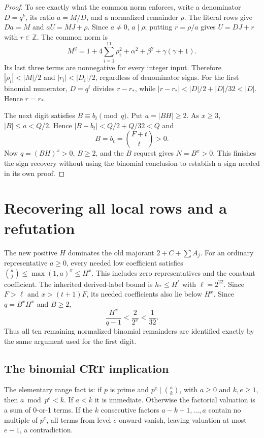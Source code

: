 \begin{proof}
To see exactly what the common norm enforces, write a denominator
$D=q^k$, its ratio $a=M/D$, and a normalized remainder $\rho$.
The literal rows give $Da=M$ and $aU=MJ+\rho$. Since $a\ne0$,
$a\mid\rho$; putting $r=\rho/a$ gives $U=DJ+r$ with $r\in\mathbb Z$.
The common norm is
\begin{equation}\label{eq:common}
 M^2=1+4\sum_{i=1}^{11}\rho_i^2+\alpha^2+\beta^2+\gamma(\gamma+1).
\end{equation}
Its last three terms are nonnegative for every integer input. Therefore
$|\rho_i|<|M|/2$ and $|r_i|<|D_i|/2$, regardless of denominator signs.
For the first binomial numerator, $D=q^t$ divides $r-r_*$, while
$|r-r_*|<|D|/2+|D|/32<|D|$. Hence $r=r_*$.

The next digit satisfies $B\equiv b_t\pmod q$. Put $a=|BH|\ge2$.
As $x\ge3$, $|B|\le a<Q/2$. Hence
$|B-b_t|<Q/2+Q/32<Q$ and
\begin{equation}\label{eq:binomial}
 B=b_t=\binom{F+t}{t}>0.
\end{equation}
Now $q=(BH)^x>0$, $B\ge2$, and the $B$ request gives $N=B^x>0$.
This finishes the sign recovery without using the binomial conclusion
to establish a sign needed in its own proof.
\end{proof}

\section{Recovering all local rows and a refutation}\label{sec:sound}

The new positive $H$ dominates the old majorant $2+C+\sum A_j$.
For an ordinary representative $a\ge0$, every needed low coefficient
satisfies $\binom aj\le\max(1,a)^x\le H^x$. This includes zero
representatives and the constant coefficient. The inherited derived-label
bound is $h_*\le H^{\ell}$ with $\ell=2^{22}$. Since $F>\ell$ and
$x>(t+1)F$, its needed coefficients also lie below $H^x$.
Since $q=B^xH^x$ and $B\ge2$,
\[
 \frac{H^x}{q-1}<\frac{2}{2^x}<\frac1{32}.
\]
Thus all ten remaining normalized binomial remainders are identified
exactly by the same argument used for the first digit.

\subsection{The binomial CRT implication}

The elementary range fact is: if $p$ is prime and $p^e\mid\binom ak$, with $a\ge0$ and
$k,e\ge1$, then $a\bmod p^e<k$. If $a<k$ it is immediate. Otherwise
the factorial valuation is a sum of 0-or-1 terms. If the $k$ consecutive
factors $a-k+1,\ldots,a$ contain no multiple of $p^e$, all terms from
level $e$ onward vanish, leaving valuation at most $e-1$, a contradiction.

